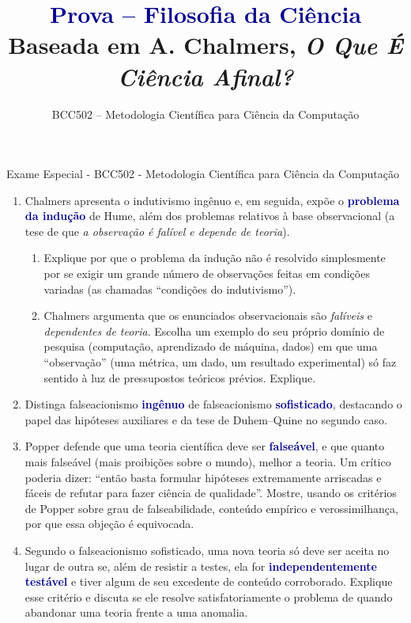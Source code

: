 \documentclass[10pt]{extarticle}
\title{\textcolor{darkblue}{\textbf{Prova -- Filosofia da Ciência}}\\[2mm]
\large Baseada em A. Chalmers, \textit{O Que É Ciência Afinal?}}
\author{BCC502 -- Metodologia Científica para Ciência da Computação}
\date{}
\newcommand{\impt}[1]{\textcolor{darkblue}{\textbf{#1}}}
\begin{document}
\thispagestyle{fancy}

\begin{center}
   \large Exame Especial - BCC502 - Metodologia Científica para Ciência da Computação
\end{center}

\vspace{2mm}

\begin{enumerate}

\item Chalmers apresenta o indutivismo ingênuo e, em seguida, expõe o \impt{problema da indução} de Hume, além dos problemas relativos à base observacional (a tese de que \emph{a observação é falível e depende de teoria}).

\begin{enumerate}
\item Explique por que o problema da indução não é resolvido simplesmente por se exigir um grande número de observações feitas em condições variadas (as chamadas ``condições do indutivismo'').
\item Chalmers argumenta que os enunciados observacionais são \emph{falíveis} e \emph{dependentes de teoria}. Escolha um exemplo do seu próprio domínio de pesquisa (computação, aprendizado de máquina, dados) em que uma ``observação'' (uma métrica, um dado, um resultado experimental) só faz sentido à luz de pressupostos teóricos prévios. Explique.
\end{enumerate}



\item Distinga falseacionismo \impt{ingênuo} de falseacionismo \impt{sofisticado}, destacando o papel das hipóteses auxiliares e da tese de Duhem--Quine no segundo caso.
\item Popper defende que uma teoria científica deve ser \impt{falseável}, e que quanto mais falseável (mais proibições sobre o mundo), melhor a teoria. Um crítico poderia dizer: ``então basta formular hipóteses extremamente arriscadas e fáceis de refutar para fazer ciência de qualidade''. Mostre, usando os critérios de Popper sobre grau de falseabilidade, conteúdo empírico e verossimilhança, por que essa objeção é equivocada.
\item Segundo o falseacionismo sofisticado, uma nova teoria só deve ser aceita no lugar de outra se, além de resistir a testes, ela for \impt{independentemente testável} e tiver algum de seu excedente de conteúdo corroborado. Explique esse critério e discuta se ele resolve satisfatoriamente o problema de quando abandonar uma teoria frente a uma anomalia.






\end{enumerate}
\end{document}
